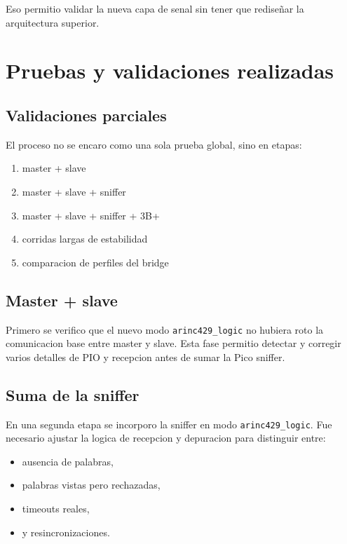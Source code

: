 \documentclass[12pt,a4paper,oneside]{report}
\begin{document}
Eso permitio validar la nueva capa de senal sin tener que rediseñar la arquitectura superior.

\chapter{Pruebas y validaciones realizadas}

\section{Validaciones parciales}

El proceso no se encaro como una sola prueba global, sino en etapas:

\begin{enumerate}[leftmargin=1.2cm]
    \item master + slave
    \item master + slave + sniffer
    \item master + slave + sniffer + 3B+
    \item corridas largas de estabilidad
    \item comparacion de perfiles del bridge
\end{enumerate}

\section{Master + slave}

Primero se verifico que el nuevo modo \texttt{arinc429\_logic} no hubiera roto la comunicacion base entre master y slave. Esta fase permitio detectar y corregir varios detalles de PIO y recepcion antes de sumar la Pico sniffer.

\section{Suma de la sniffer}

En una segunda etapa se incorporo la sniffer en modo \texttt{arinc429\_logic}. Fue necesario ajustar la logica de recepcion y depuracion para distinguir entre:

\begin{itemize}[leftmargin=1.2cm]
    \item ausencia de palabras,
    \item palabras vistas pero rechazadas,
    \item timeouts reales,
    \item y resincronizaciones.
\end{itemize}
\end{document}
